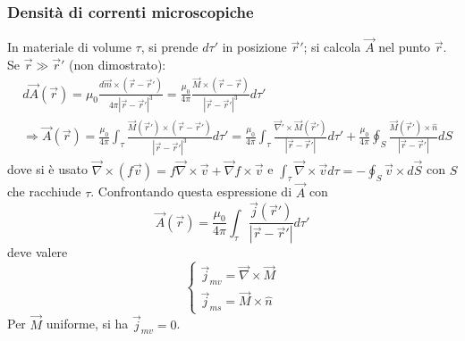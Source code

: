 \documentclass[10pt, a4paper]{scrartcl}
\numberwithin{equation}{subsection}
\theoremstyle{style1}
\begin{document}
\subsubsection{Densit\`a di correnti microscopiche}
In materiale di volume $\tau $, si prende $d\tau '$ in posizione $\vec{r}'$; si calcola $\vec{A}$ nel punto $\vec{r}$. Se $\vec{r} \gg \vec{r}'$ (non dimostrato):
\begin{equation*}
	\begin{split}
		&d\vec{A}(\vec{r}) = \mu_0 \frac{d\vec{m}\times( \vec{r}-\vec{r}')}{4\pi \left\lvert \vec{r}-\vec{r}' \right\rvert ^3} = \frac{\mu_0}{4 \pi} \frac{\vec{M} \times (\vec{r}-\vec{r})}{\left\lvert \vec{r}-\vec{r}' \right\rvert^3 } d\tau '\\
		&\Rightarrow \vec{A}(\vec{r}) = \frac{\mu_0}{4\pi}\int_{\tau } \frac{\vec{M}(\vec{r}') \times (\vec{r}-\vec{r}')}{\left\lvert \vec{r}-\vec{r}' \right\rvert ^3}d\tau ' = \frac{\mu_0}{4\pi} \int_{\tau } \frac{\vec{\nabla }' \times \vec{M}(\vec{r}')}{\left\lvert \vec{r}-\vec{r}' \right\rvert } d\tau '+\frac{\mu_0}{4 \pi}\oint_{S} \frac{\vec{M}(\vec{r}') \times \hat{n}}{\left\lvert \vec{r}-\vec{r}' \right\rvert }dS
	\end{split}
\end{equation*}
dove si \`e usato $\vec{\nabla }\times (f\vec{v}) = f\vec{\nabla }\times \vec{v} + \vec{\nabla }f\times \vec{v}$ e $\int_{\tau } \vec{\nabla }\times \vec{v}d\tau  = - \oint_{S} \vec{v}\times d\vec{S}$ con $S$ che racchiude $\tau $. Confrontando questa espressione di $\vec{A}$ con
\begin{equation*}
	\vec{A}(\vec{r}) = \frac{\mu_0}{4\pi}\int_{\tau } \frac{\vec{j}(\vec{r}')}{\left\lvert \vec{r}-\vec{r}' \right\rvert }d\tau '
\end{equation*}
deve valere
\begin{equation}
	\begin{cases}
		\vec{j}_{mv} = \vec{\nabla }\times \vec{M}\\
		\vec{j}_{ms} = \vec{M}\times \hat{n}
	\end{cases}
\end{equation}
Per $\vec{M}$ uniforme, si ha $ \vec{j}_{mv} =0$.
\end{document}
